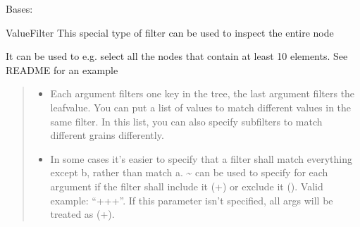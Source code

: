 \documentclass[a4paper,10pt,english]{sphinxmanual}
\begin{document}
\begin{fulllineitems}
\label{\detokenize{fagus:fagus.VFil}}
\pysigstartsignatures
{}
\pysigstopsignatures
\sphinxAtStartPar
Bases: {\hyperref[\detokenize{fagus.filters:fagus.filters.FilBase}]{}}

\sphinxAtStartPar
ValueFilter \sphinxhyphen{} This special type of filter can be used to inspect the entire node

\sphinxAtStartPar
It can be used to e.g. select all the nodes that contain at least 10 elements. See README for an example

\begin{fulllineitems}
\label{\detokenize{fagus:fagus.VFil.__init__}}
\pysigstartsignatures
{}
\pysigstopsignatures\begin{quote}\begin{description}
\begin{itemize}
\item {}
\sphinxAtStartPar
{} \textendash{} Each argument filters one key in the tree, the last argument filters the leaf\sphinxhyphen{}value. You can
put a list of values to match different values in the same filter. In this list, you can also specify
subfilters to match different grains differently.

\item {}
\sphinxAtStartPar
{} \textendash{} In some cases it’s easier to specify that a filter shall match everything except b, rather than
match a. \textasciitilde{} can be used to specify for each argument if the filter shall include it (+) or exclude it
(\sphinxhyphen{}). Valid example: “++\sphinxhyphen{}+”. If this parameter isn’t specified, all args will be treated as (+).


\end{itemize}
\end{description}
\end{quote}
\end{fulllineitems}
\end{fulllineitems}
\end{document}
